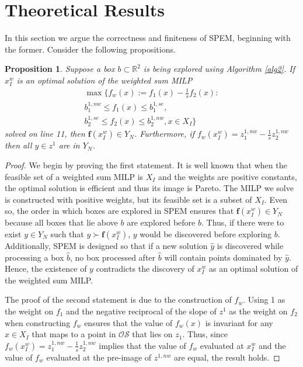 \documentclass[12pt]{article}
\newtheorem{prop}{Proposition}
\newcommand{\R}{\mathbb{R}}
\newcommand{\dom}{\succ}
\newcommand{\OS}{\mathcal{OS}}
\newcommand{\objf}{\boldsymbol{f}}
\begin{document}
\section{Theoretical Results}\label{theory}

In this section we argue the correctness and finiteness of SPEM, beginning with the former. Consider the following propositions. 

\begin{prop}\label{prop1}
Suppose a box $b \subset \R^2$ is being explored using Algorithm \ref{alg2}. If $x_I^w$ is an optimal solution of the weighted sum MILP 
\begin{multline*}
\max\{f_w(x):= f_1(x)-\frac{1}{s}f_2(x):\\ b^{1,nw}_1 \leq f_1(x) \leq  b^{1,se}_1,\\ b^{1,se}_2 \leq f_2(x) \leq  b^{1,nw}_2, x \in X_I\}
\end{multline*} solved on line 11, then $\objf(x_I^w) \in Y_N$. Furthermore, if $f_w(x_I^w)= z^{1,nw}_1 - \frac{1}{s}z^{1,nw}_2$ then all $y \in z^1$ are in $Y_N$.
\end{prop}

\begin{proof}
We begin by proving the first statement. It is well known \citep{ehrgott2005multicriteria} that when the feasible set of a weighted sum MILP is $X_I$ and the weights are positive constants, the optimal solution is efficient and thus its image is Pareto. The MILP we solve is constructed with positive weights, but its feasible set is a subset of $X_I$. Even so, the order in which boxes are explored in SPEM ensures that $\objf(x_I^w) \in Y_N$ because all boxes that lie above $b$ are explored before $b$. Thus, if there were to exist $y \in Y_N$ such that $y \dom \objf(x_I^w)$, $y$ would be discovered before exploring $b$. Additionally, SPEM is designed so that if a new solution $\hat{y}$ is discovered while processing a box $\hat{b}$, no box processed after $\hat{b}$ will contain points dominated by $\hat{y}$. Hence, the existence of $y$ contradicts the discovery of $x_I^w$ as an optimal solution of the weighted sum MILP.

The proof of the second statement is due to the construction of $f_w$. Using 1 as the weight on $f_1$ and the negative reciprocal of the slope of $z^1$ as the weight on $f_2$ when constructing $f_w$ ensures that the value of $f_w(x)$ is invariant for any $x \in X_I$ that maps to a point in $\OS$ that lies on $z_1$. Thus, since $f_w(x_I^w)= z^{1,nw}_1 - \frac{1}{s}z^{1,nw}_2$ implies that the value of $f_w$ evaluated at $x_I^w$ and the value of $f_w$ evaluated at the pre-image of $z^{1,nw}$ are equal, the result holds.
\end{proof}
\end{document}
